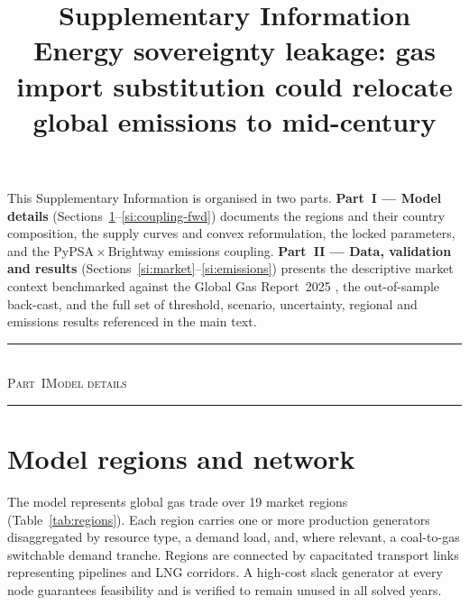 \documentclass[11pt]{article}
\title{\textbf{Supplementary Information}\\[4pt]
Energy sovereignty leakage: gas import substitution could relocate global
emissions to mid-century}
\author{}
\date{}
\begin{document}
\maketitle
\tableofcontents
\vspace{1em}

\noindent This Supplementary Information is organised in two parts.
\textbf{Part~I --- Model details} (Sections~\ref{si:regions}--\ref{si:coupling-fwd})
documents the regions and their country composition, the supply curves and
convex reformulation, the locked parameters, and the PyPSA\,$\times$\,Brightway
emissions coupling. \textbf{Part~II --- Data, validation and results}
(Sections~\ref{si:market}--\ref{si:emissions}) presents the descriptive market
context benchmarked against the Global Gas Report~2025 \citep{ggr2025}, the
out-of-sample back-cast, and the full set of threshold, scenario, uncertainty,
regional and emissions results referenced in the main text.

\begin{center}\rule{0.6\linewidth}{0.4pt}\\[2pt]
\textsc{Part~I\quad Model details}\\
\rule{0.6\linewidth}{0.4pt}\end{center}

\section{Model regions and network}\label{si:regions}

The model represents global gas trade over 19 market regions
(Table~\ref{tab:regions}). Each region carries one or more production
generators disaggregated by resource type, a demand load, and, where
relevant, a coal-to-gas switchable demand tranche. Regions are connected by
capacitated transport links representing pipelines and LNG corridors. A
high-cost slack generator at every node guarantees feasibility and is
verified to remain unused in all solved years.
\end{document}
